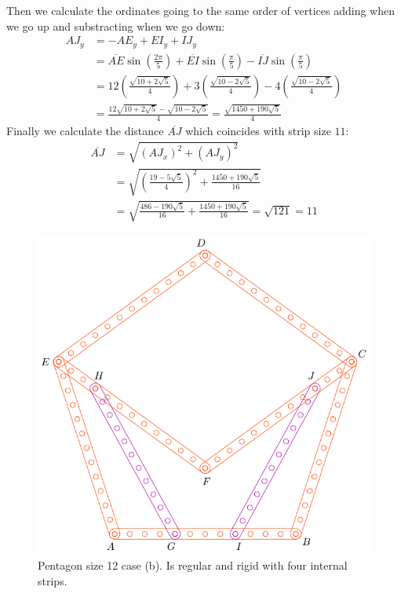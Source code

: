 \documentclass[11pt]{article}
\begin{document}
Then we calculate the ordinates going to the same order of vertices adding when we go up and substracting when we go down:
\begin{align}
AJ_y &= -AE_y + EI_y + IJ_y\\
 &= \overline{AE}\sin\left(\frac{2\pi}5\right)
 + \overline{EI}\sin\left(\frac{\pi}5\right) 
 - \overline{IJ}\sin\left(\frac{\pi}5\right)\nonumber\\
 &= 12\left(\frac{\sqrt{10+2\sqrt5}}4\right)
 + 3\left(\frac{\sqrt{10-2\sqrt5}}4\right)
 - 4\left(\frac{\sqrt{10-2\sqrt5}}4\right)\nonumber\\
 &= \frac{12\sqrt{10+2\sqrt5} - \sqrt{10-2\sqrt5}}4 = \frac{\sqrt{1450+190\sqrt5}}4
\end{align}
Finally we calculate the distance $\overline{AJ}$ which coincides with strip size $11$:
\begin{align}
\overline{AJ} &= \sqrt{(AJ_x)^2 + (AJ_y)^2}\\
 &= \sqrt{\left(\frac{19-5\sqrt5}4\right)^2 + \frac{1450+190\sqrt5}{16}}\nonumber\\
 &= \sqrt{\frac{486-190\sqrt5}{16} + \frac{1450+190\sqrt5}{16}} = \sqrt{121} = 11
\end{align}

\begin{figure}[h]
 \centering
 \includegraphics[scale=1]{12/penta12b}
 \caption{Pentagon size 12 case (b). Is regular and rigid with four internal strips.}
 \label{fig:penta12b}
\end{figure}
\end{document}
